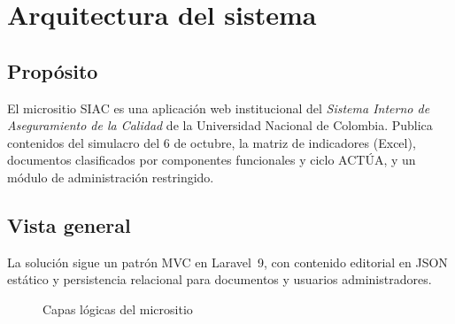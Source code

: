 \chapter{Arquitectura del sistema}

\section{Propósito}
El micrositio SIAC es una aplicación web institucional del \emph{Sistema Interno de Aseguramiento de la Calidad} de la Universidad Nacional de Colombia. Publica contenidos del simulacro del 6 de octubre, la matriz de indicadores (Excel), documentos clasificados por componentes funcionales y ciclo ACTÚA, y un módulo de administración restringido.

\section{Vista general}
La solución sigue un patrón MVC en Laravel~9, con contenido editorial en JSON estático y persistencia relacional para documentos y usuarios administradores.

\begin{figure}[H]
  \centering
  \caption{Capas lógicas del micrositio}
\end{figure}

